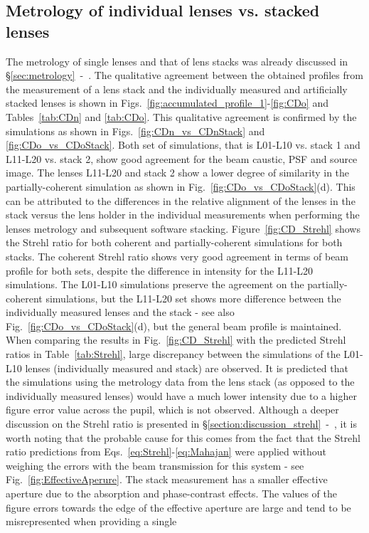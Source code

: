 \begin{refsection}
\subsection{Metrology of individual lenses vs. stacked lenses}\label{sec:stacking}

The metrology of single lenses and that of lens stacks was already discussed in \S\ref{sec:metrology}~-~\textit{}. The qualitative agreement between the obtained profiles from the measurement of a lens stack and the individually measured and artificially stacked lenses is shown in Figs.~\ref{fig:accumulated_profile_1}-\ref{fig:CDo} and Tables~\ref{tab:CDn} and \ref{tab:CDo}. This qualitative agreement is confirmed by the simulations as shown in Figs.~\ref{fig:CDn_vs_CDnStack} and \ref{fig:CDo_vs_CDoStack}. Both set of simulations, that is L01-L10 vs. stack 1 and L11-L20 vs. stack 2, show good agreement for the beam caustic, PSF and source image. The lenses L11-L20 and stack 2 show a lower degree of similarity in the partially-coherent simulation as shown in Fig.~\ref{fig:CDo_vs_CDoStack}(d). This can be attributed to the differences in the relative alignment of the lenses in the stack versus the lens holder in the individual measurements when performing the lenses metrology and subsequent software stacking. Figure~\ref{fig:CD_Strehl} shows the Strehl ratio for both coherent and partially-coherent simulations for both stacks. The coherent Strehl ratio shows very good agreement in terms of beam profile for both sets, despite the difference in intensity for the L11-L20 simulations. The L01-L10 simulations preserve the agreement on the partially-coherent simulations, but the L11-L20 set shows more difference between the individually measured lenses and the stack - see also Fig.~\ref{fig:CDo_vs_CDoStack}(d), but the general beam profile is maintained. When comparing the results in Fig.~\ref{fig:CD_Strehl} with the predicted Strehl ratios in Table~\ref{tab:Strehl}, large discrepancy between the simulations of the L01-L10 lenses (individually measured and stack) are observed. It is predicted that the simulations using the metrology data from the lens stack (as opposed to the individually measured lenses) would have a much lower intensity due to a higher figure error value across the pupil, which is not observed. Although a deeper discussion on the Strehl ratio is presented in \S\ref{section:discussion_strehl}~-~\textit{}, it is worth noting that the probable cause for this comes from the fact that the Strehl ratio predictions from Eqs.~\ref{eq:Strehl}-\ref{eq:Mahajan} were applied without weighing the errors with the beam transmission for this system - see Fig.~\ref{fig:EffectiveAperure}. The stack measurement has a smaller effective aperture due to the absorption and phase-contrast effects. The values of the figure errors towards the edge of the effective aperture are large and tend to be misrepresented when providing a single 
\end{refsection}
